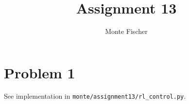 \documentclass{article}
\title{Assignment 13}
\author{Monte Fischer}
\begin{document}
\maketitle

\section*{Problem 1}
See implementation in \texttt{monte/assignment13/rl\_control.py}.
\end{document}
